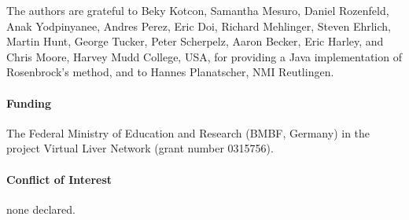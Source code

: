 \documentclass{bioinfo}
\begin{document}
The authors are grateful to Beky Kotcon, Samantha Mesuro, Daniel Rozenfeld, Anak
Yodpinyanee, Andres Perez, Eric Doi, Richard Mehlinger, Steven Ehrlich, Martin
Hunt, George Tucker, Peter Scherpelz, Aaron Becker, Eric Harley, and Chris
Moore, Harvey Mudd College, USA, for providing a Java implementation of
Rosenbrock's method, and to Hannes Planatscher, NMI Reutlingen.

\paragraph{Funding\textcolon} 
The Federal Ministry of Education and Research (BMBF, Germany) in the project
Virtual Liver Network (grant number 0315756).

\paragraph{Conflict of Interest\textcolon} none declared.


%
%
%
%
%
%
%

\end{document}
